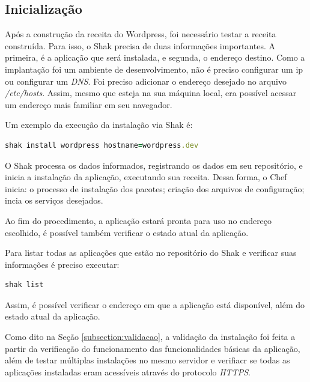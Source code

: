 \subsection{Inicialização}

Após a construção da receita do Wordpress, foi necessário testar a receita construída. 
Para isso, o Shak precisa de duas informações importantes. A primeira, é a aplicação
que será instalada, e segunda, o endereço destino. Como a implantação foi um ambiente de desenvolvimento,
não é preciso configurar um ip ou configurar um \textit{DNS}. Foi preciso adicionar o
endereço desejado no arquivo \textit{/etc/hosts}. Assim, mesmo que esteja na sua máquina local, 
era possível acessar um endereço mais familiar em seu navegador. 

Um exemplo da execução da instalação via Shak é:

\begin{lstlisting}[basicstyle=\ttfamily, language=Ruby,label=dice_index,caption={Exemplo de execução de instalação do wordpress com shak}]
shak install wordpress hostname=wordpress.dev
\end{lstlisting}

O Shak processa os dados informados, registrando os dados em seu repositório, e
inicia a instalação da aplicação, executando sua receita. Dessa forma, o 
Chef inicia: o processo de instalação dos pacotes; criação dos arquivos
de configuração; incia os serviços desejados.

Ao fim do procedimento, a aplicação estará pronta para uso no endereço escolhido,
é possível também verificar o estado atual da aplicação.

Para listar todas as aplicações que estão no repositório do Shak e verificar 
suas informações é preciso executar:

\begin{lstlisting}[basicstyle=\ttfamily, language=Ruby,label=dice_index,caption={Listagem de aplicações instaladas pelo shak}]
shak list
\end{lstlisting}

Assim, é possível verificar o endereço em que a aplicação está disponível,
além do estado atual da aplicação.

Como dito na Seção \ref{subsection:validacao}, a validação da instalação foi feita
a partir da verificação do funcionamento das funcionalidades básicas da aplicação,
além de testar múltiplas instalações no mesmo servidor e verifiacr se todas as
aplicações instaladas eram acessíveis através do protocolo \textit{HTTPS}.

